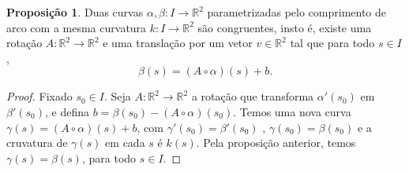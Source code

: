 \documentclass[12pt,leqno,twoside]{amsart}
\theoremstyle{definition}
\newtheorem{lema}{Lema}[section]
\newtheorem{proposicao}{Proposição}[section]
\newcommand{\sen}{\operatorname{sen}}
\begin{document}
	\begin{comment}
		\begin{lema}
			Translações e rotações de um caminho $\alpha$ não alteram sua curvatura $k(t)$.
		\end{lema}
		\begin{proof}
			Seja $\alpha:I\to \mathbb{R}$ um caminho diferenciável. Uma translação de $\alpha$ é dada por $\beta(r)  = \alpha(t)+v$. Temos $t_{\beta} = \beta'(t) = \alpha'(t) = t_{\alpha}$. Logo suas curvaturas são iguais.

			Uma rotação de $\alpha$ de $\theta$ graus em volta da origem é dada por $\gamma(s) = \left[\begin{matrix} \cos(\theta) & -\sen(\theta) \\ \sen(\theta) & \cos(\theta) \end{matrix}\right] \cdot  \alpha(s) = (\cos(\theta)x(s) -\sen(\theta)y(s), \sen(\theta)x(s) - \cos(\theta) y(s))$. Logo $t_{\gamma}(s) = \gamma'(s) = (\cos(\theta)x'(s) -\sen(\theta)y'(s), \sen(\theta) x'(s) - \cos(\theta)y'(s)) = \left[\begin{matrix} \cos(\theta) & -\sen(\theta) \\ \sen(\theta) & \cos(\theta) \end{matrix}\right] \cdot  \alpha'(s) $ e  $t_{\gamma}'(s) =  (\cos(\theta)x''(s) -\sen(\theta)y''(s), \sen(\theta) x''(s) - \cos(\theta)y''(s)) = \left[\begin{matrix} \cos(\theta) & -\sen(\theta) \\ \sen(\theta) & \cos(\theta) \end{matrix}\right] \cdot  \alpha''(s) $. Logo $$ t_{\gamma}(s) = \left[\begin{matrix} \cos(\theta) & -\sen(\theta) \\ \sen(\theta) & \cos(\theta) \end{matrix}\right] \cdot  \alpha'(s) $$ $$ n_{\gamma}(s) = \left[\begin{matrix} \cos(\theta) & -\sen(\theta) \\ \sen(\theta) & \cos(\theta) \end{matrix}\right] \cdot  \alpha'(s) $$
		\end{proof}
	\end{comment}
	\begin{proposicao}
		Duas curvas $\alpha,\beta:I\to \mathbb{R}^2$ parametrizadas pelo comprimento de arco com a mesma curvatura $k:I\to\mathbb{R}^2$ são congruentes, insto é, existe uma rotação $A:\mathbb{R}^2 \to \mathbb{R}^2$ e uma translação por um vetor $v\in \mathbb{R}^2$ tal que para todo $s\in I$, $$\beta(s) = (A \circ \alpha)(s) +b.$$
	\end{proposicao}
	\begin{proof}
		Fixado $s_0 \in I$. Seja $A:\mathbb{R}^2 \to \mathbb{R}^2$ a rotação que transforma $\alpha'(s_0)$ em $\beta'(s_0)$, e defina $b = \beta(s_0) - (A\circ \alpha)(s_0)$. Temos uma nova curva $\gamma(s) =(A\circ \alpha)(s) + b$, com $\gamma'(s_0) = \beta'(s_0)$ , $\gamma(s_0) = \beta(s_0)$ e a cruvatura de $\gamma(s)$ em cada $s$ é $k(s)$. Pela proposição anterior, temos $\gamma(s) = \beta(s)$, para todo $s\in I$.
	\end{proof}
\end{document}
